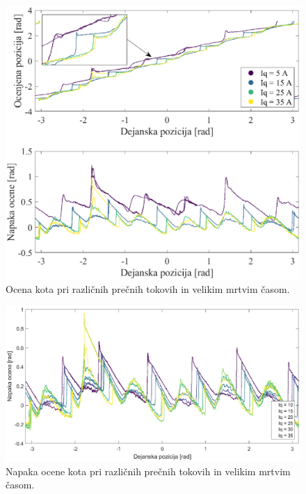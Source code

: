 \documentclass[a4paper,twoside,openright,12pt,slovene]{book}
\begin{document}

\begin{figure}[!htbp]
    \centering
    \includegraphics[width=0.9\columnwidth]{Slike/vsiljenaPozicijaTokoviZMrtvimCasom_angle.eps}
    \caption{\label{vsiljenaPozicijaTokoviZMrtvimCasom_angle} Ocena kota pri različnih prečnih tokovih in velikim mrtvim časom. }
\end{figure}

\begin{figure}[!htbp]
    \centering
    \includegraphics[width=1.05\columnwidth]{Slike/vsiljenaPozicijaTokoviZMrtvimCasom_angleError.eps}
    \caption{\label{vsiljenaPozicijaTokoviZMrtvimCasom_angleError} Napaka ocene kota pri različnih prečnih tokovih in velikim mrtvim časom. }
\end{figure}
\end{document}
